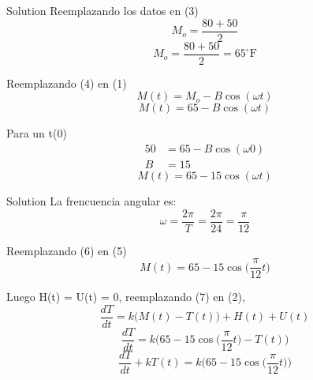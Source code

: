 \documentclass[10 pt]{beamer}
\begin{document}
\begin{frame}
    \begin{block}{Solution}
        Reemplazando los datos en (3)
        \begin{equation*}
            M_o = \dfrac{80 + 50}{2}
        \end{equation*}
        \begin{equation}
            M_o = \dfrac{80 + 50}{2} = 65^\circ \text{F}
        \end{equation}

        Reemplazando (4) en (1)
        \begin{equation*}
            M(t) = M_o - B\cos(\omega t)
        \end{equation*}
        \begin{equation*}
            M(t) = 65 - B\cos(\omega t)
        \end{equation*}

        Para un t(0)
        \begin{align*}
            50 & = 65 - B\cos(\omega 0) \\
            B  & = 15
        \end{align*}
        \begin{equation}
            M(t) = 65 - 15\cos(\omega t)
        \end{equation}
    \end{block}
\end{frame}

\begin{frame}
    \begin{block}{Solution}
        La frencuencia angular es:
        \begin{equation}
            \omega = \dfrac{2\pi}{T} = \dfrac{2\pi}{24} = \dfrac{\pi}{12}
        \end{equation}

        Reemplazando (6) en (5)
        \begin{equation}
            M(t) = 65 - 15\cos\bigg(\dfrac{\pi}{12}t\bigg)
        \end{equation}

        Luego H(t) = U(t) = 0, reemplazando (7) en (2),
        \begin{equation*}
            \dfrac{dT}{dt} = k \bigg( M(t) - T(t) \bigg) + H(t) + U(t)
        \end{equation*}
        \begin{equation*}
            \dfrac{dT}{dt} = k \bigg(65 - 15\cos\bigg(\dfrac{\pi}{12}t\bigg) - T(t) \bigg)
        \end{equation*}
        \begin{equation}
            \dfrac{dT}{dt} + kT(t) = k \bigg(65 - 15\cos\bigg(\dfrac{\pi}{12}t \bigg) \bigg)
        \end{equation}
    \end{block}
\end{frame}
\end{document}
